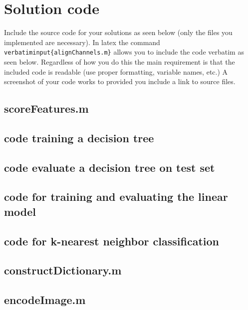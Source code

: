 \documentclass[10pt,letterpaper]{article}
\newcommand{\cmd}[1] {{\color{blue}\texttt{#1}}}
\begin{document}
\section{Solution code}
Include the source code for your solutions as seen below (only the files you implemented are necessary). 
In latex the command \cmd{verbatiminput\{alignChannels.m\}} allows you to include the code verbatim as seen below. 
Regardless of how you do this the main requirement is that the included code is readable (use proper formatting, variable names, etc.)
A screenshot of your code works to provided you include a link to source files.



\subsection{scoreFeatures.m}

\subsection{code training a decision tree}
\subsection{code evaluate a decision tree on test set}
\subsection{code for training and evaluating the linear model}
\subsection{code for k-nearest neighbor classification}
\subsection{constructDictionary.m}
\subsection{encodeImage.m}
\end{document}

